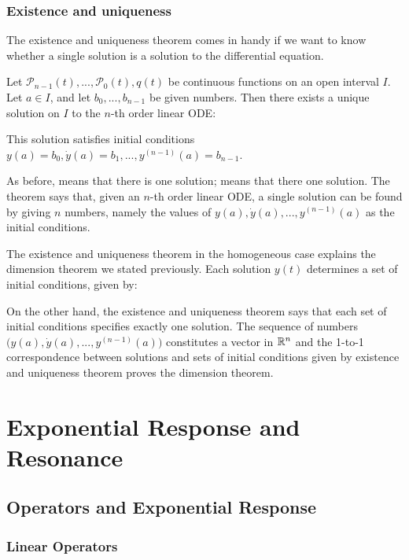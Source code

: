 \documentclass[11pt, openright]{book}
\begin{document}
\subsection{Existence and uniqueness}

The existence and uniqueness theorem comes in handy if we want to know whether a single solution is a solution to the differential equation.

Let $\mathcal{P}_{n-1}(t),...,\mathcal{P}_0(t),q(t)$ be continuous functions on an open interval $I$. Let $a\in I$, and let $b_0,...,b_{n-1}$ be given numbers. Then there exists a unique solution on $I$ to the $n$-th order linear ODE:

This solution satisfies initial conditions $y(a)=b_0, \dot{y}(a)=b_1, ..., y^{(n-1)}(a)=b_{n-1}$.

As before,  means that there is  one solution;  means that there  one solution.
The theorem says that, given an $n$-th order linear ODE, a single solution can be found by giving $n$ numbers, namely the values of $y(a),\dot{y}(a),...,y^{(n-1)}(a)$ as the initial conditions.

The existence and uniqueness theorem in the homogeneous case explains the dimension theorem we stated previously. Each solution $y(t)$ determines a set of initial conditions, given by:

On the other hand, the existence and uniqueness theorem says that each set of initial conditions specifies exactly one solution. The sequence of numbers $\Big(y(a),\dot{y}(a),...,y^{(n-1)}(a)\Big)$ constitutes a vector in $\mathbb{R}^{n}$ and the 1-to-1 correspondence between solutions and sets of initial conditions given by existence and uniqueness theorem proves the dimension theorem.

\chapter{Exponential Response and Resonance}

\section{Operators and Exponential Response}

\subsection{Linear Operators}
\end{document}
